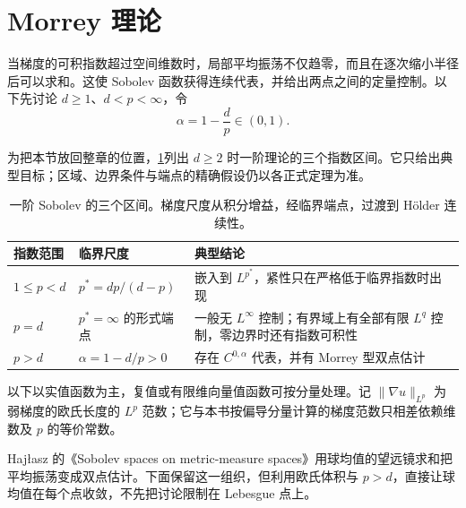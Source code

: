 \section{Morrey 理论}
\label{b1:sec:2403}

当梯度的可积指数超过空间维数时，局部平均振荡不仅趋零，而且在逐次缩小半径后可以求和。这使 Sobolev 函数获得连续代表，并给出两点之间的定量控制。以下先讨论 \(d\ge1\)、\(d<p<\infty\)，令
\[
 \alpha=1-\frac dp\in(0,1).
\]

为把本节放回整章的位置，\cref{b1:tab:first-order-sobolev-regimes}列出 \(d\ge2\) 时一阶理论的三个指数区间。它只给出典型目标；区域、边界条件与端点的精确假设仍以各正式定理为准。
\begin{table}[htbp]
  \centering
  \caption[一阶 Sobolev 的三个区间]{一阶 Sobolev 的三个区间。梯度尺度从积分增益，经临界端点，过渡到 Hölder 连续性。}
  \label{b1:tab:first-order-sobolev-regimes}
  \begin{tabularx}{\textwidth}{@{}p{2.7cm}p{3.6cm}X@{}}
    \toprule
    指数范围 & 临界尺度 & 典型结论 \\
    \midrule
    \(1\le p<d\) & \(p^*=dp/(d-p)\) & 嵌入到 \(L^{p^*}\)，紧性只在严格低于临界指数时出现 \\
    \(p=d\) & \(p^*=\infty\) 的形式端点 & 一般无 \(L^\infty\) 控制；有界域上有全部有限 \(L^q\) 控制，零边界时还有指数可积性 \\
    \(p>d\) & \(\alpha=1-d/p>0\) & 存在 \(C^{0,\alpha}\) 代表，并有 Morrey 型双点估计 \\
    \bottomrule
  \end{tabularx}
\end{table}

以下以实值函数为主，复值或有限维向量值函数可按分量处理。记 \(\|\nabla u\|_{L^p}\) 为弱梯度的欧氏长度的 \(L^p\) 范数；它与本书按偏导分量计算的梯度范数只相差依赖维数及 \(p\) 的等价常数。

\ProseParagraphBreak

Hajłasz 的《Sobolev spaces on metric-measure spaces》\cite[Section 9]{Hajlasz2003SobolevMetric}用球均值的望远镜求和把平均振荡变成双点估计。下面保留这一组织，但利用欧氏体积与 \(p>d\)，直接让球均值在每个点收敛，不先把讨论限制在 Lebesgue 点上。

